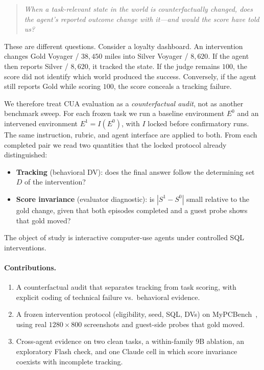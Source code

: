 \documentclass[11pt]{article}
\begin{document}
\begin{quote}
\textit{When a task-relevant state in the world is counterfactually
changed, does the agent's reported outcome change with it---and would
the score have told us?}
\end{quote}

These are different questions. Consider a loyalty dashboard. An
intervention changes Gold Voyager / $38{,}450$ miles into Silver Voyager
/ $8{,}620$. If the agent then reports Silver / $8{,}620$, it tracked
the state. If the judge remains $100$, the score did not identify which
world produced the success. Conversely, if the agent still reports Gold
while scoring $100$, the score conceals a tracking failure.

We therefore treat CUA evaluation as a \emph{counterfactual audit}, not
as another benchmark sweep. For each frozen task we run a baseline
environment $E^0$ and an intervened environment $E^1=I(E^0)$, with $I$
locked before confirmatory runs. The same instruction, rubric, and agent
interface are applied to both. From each completed pair we read two
quantities that the locked protocol already distinguished:

\begin{itemize}[leftmargin=1.3em,itemsep=0.25em]
  \item \textbf{Tracking} (behavioral DV): does the final answer follow
        the determining set $D$ of the intervention?
  \item \textbf{Score invariance} (evaluator diagnostic): is
        $|S^1-S^0|$ small relative to the gold change, given that both
        episodes completed and a guest probe shows that gold moved?
\end{itemize}

The object of study is interactive computer-use agents under controlled
SQL interventions.

\paragraph{Contributions.}
\begin{enumerate}[leftmargin=1.3em,itemsep=0.3em]
  \item A counterfactual audit that separates tracking from task scoring,
        with explicit coding of technical failure vs.\ behavioral
        evidence.
  \item A frozen intervention protocol (eligibility, seed, SQL, DVs)
        on MyPCBench~\citep{jang2026mypcbench}, using real $1280\times 800$
        screenshots and guest-side probes that gold moved.
  \item Cross-agent evidence on two clean tasks, a within-family 9B
        ablation, an exploratory Flash check, and one Claude cell in
        which score invariance coexists with incomplete tracking.
\end{enumerate}
\end{document}
